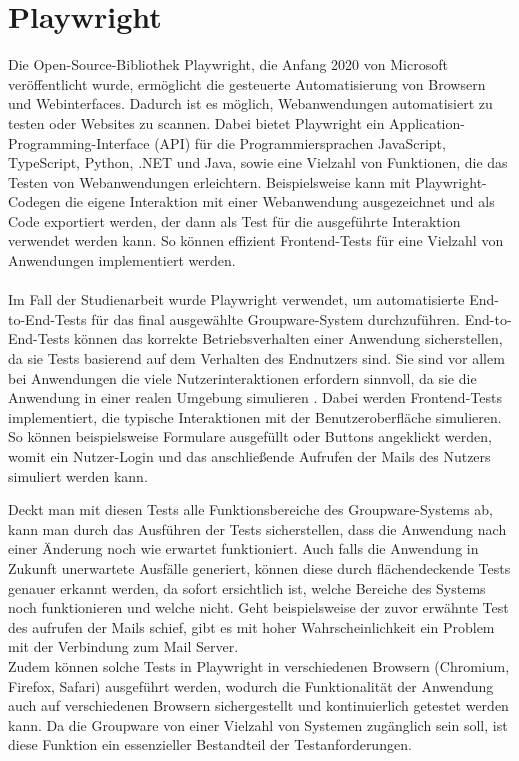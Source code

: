 \section{Playwright}

Die Open-Source-Bibliothek Playwright, die Anfang 2020 von Microsoft veröffentlicht wurde, ermöglicht die gesteuerte Automatisierung von Browsern und Webinterfaces. Dadurch ist es möglich, Webanwendungen automatisiert zu testen oder Websites zu scannen.
Dabei bietet Playwright ein Application-Programming-Interface (API) für die Programmiersprachen JavaScript, TypeScript, Python, .NET und Java, sowie eine Vielzahl von Funktionen, die das Testen von Webanwendungen erleichtern.
Beispielsweise kann mit Playwright-Codegen die eigene Interaktion mit einer Webanwendung ausgezeichnet und als Code exportiert werden, der dann als Test für die ausgeführte Interaktion verwendet werden kann.
So können effizient Frontend-Tests für eine Vielzahl von Anwendungen implementiert werden.
\autocite[Quelle:][]{playwright}
\\
\\
Im Fall der Studienarbeit wurde Playwright verwendet, um automatisierte End-to-End-Tests für das final ausgewählte Groupware-System durchzuführen.
End-to-End-Tests können das korrekte Betriebsverhalten einer Anwendung sicherstellen, da sie Tests basierend auf dem Verhalten des Endnutzers sind.
Sie sind vor allem bei Anwendungen die viele Nutzerinteraktionen erfordern sinnvoll, da sie die Anwendung in einer realen Umgebung simulieren \autocite[vgl.][]{e2e-blog}.
Dabei werden Frontend-Tests implementiert, die typische Interaktionen mit der Benutzeroberfläche simulieren.
So können beispielsweise Formulare ausgefüllt oder Buttons angeklickt werden, womit ein Nutzer-Login und das anschließende Aufrufen der Mails des Nutzers simuliert werden kann.

Deckt man mit diesen Tests alle Funktionsbereiche des Groupware-Systems ab, kann man durch das Ausführen der Tests sicherstellen, dass die Anwendung nach einer Änderung noch wie erwartet funktioniert.
Auch falls die Anwendung in Zukunft unerwartete Ausfälle generiert, können diese durch flächendeckende Tests genauer erkannt werden, da sofort ersichtlich ist, welche Bereiche des Systems noch funktionieren und welche nicht.
Geht beispielsweise der zuvor erwähnte Test des aufrufen der Mails schief, gibt es mit hoher Wahrscheinlichkeit ein Problem mit der Verbindung zum Mail Server.
\\
Zudem können solche Tests in Playwright in verschiedenen Browsern (Chromium, Firefox, Safari) ausgeführt werden, wodurch die Funktionalität der Anwendung auch auf verschiedenen Browsern sichergestellt und kontinuierlich getestet werden kann.
Da die Groupware von einer Vielzahl von Systemen zugänglich sein soll, ist diese Funktion ein essenzieller Bestandteil der Testanforderungen.








